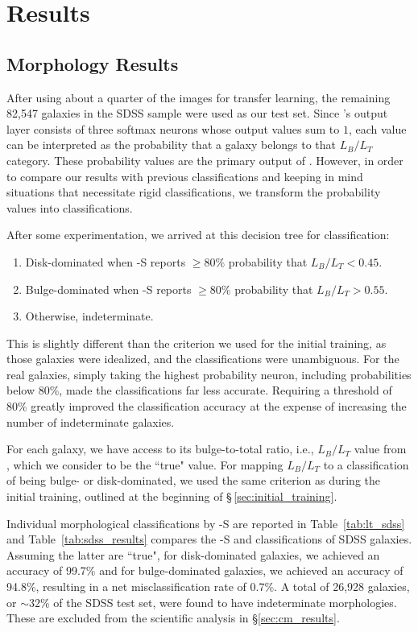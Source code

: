 \section{Results} \label{sec:results}
\subsection{Morphology Results}\label{sec:morph_results}
After using about a quarter of the images for transfer learning, the remaining 82,547 galaxies in the SDSS sample were used as our test set. Since \gamornet{}'s output layer consists of three softmax neurons whose output values sum to $1$, each value can be interpreted as the probability that a galaxy belongs to that $L_B/L_T$ category. These probability values are the primary output of \gamornet{}. However, in order to compare our results with previous classifications and keeping in mind situations that necessitate rigid classifications, we transform the probability values into classifications.

After some experimentation, we arrived at this decision tree for classification:
\begin{enumerate}[noitemsep]
\item Disk-dominated when \gamornet{}-S reports $\geq 80\%$ probability that $L_B/L_T < 0.45$.
\item Bulge-dominated when \gamornet{}-S reports $\geq 80\%$ probability that $L_B/L_T > 0.55$.
\item Otherwise, indeterminate.
\end{enumerate}
This is slightly different than the criterion we used for the initial training, as those galaxies were idealized, and the classifications were unambiguous. For the real galaxies, simply taking the highest probability neuron, including probabilities below 80\%, made the classifications far less accurate. Requiring a threshold of 80\% greatly improved the classification accuracy at the expense of increasing the number of indeterminate galaxies.


For each galaxy, we have access to its bulge-to-total ratio, i.e., $L_B/L_T$ value from \citet{simard_11}, which we consider to be the ``true" value. For mapping $L_B/L_T$ to a classification of being bulge- or disk-dominated, we used the same criterion as during the initial training, outlined at the beginning of \S\,\ref{sec:initial_training}.

Individual morphological classifications by \gamornet{}-S are reported in Table~\ref{tab:lt_sdss} and Table~\ref{tab:sdss_results} compares the \gamornet{}-S and \citet{simard_11} classifications of SDSS galaxies. Assuming the latter are ``true", for disk-dominated galaxies, we achieved an accuracy of 99.7\% and for bulge-dominated galaxies, we achieved an accuracy of 94.8\%, resulting in a net misclassification rate of 0.7\%. A total of 26,928 galaxies, or $\sim 32$\% of the SDSS test set, were found to have indeterminate morphologies. These are excluded from the scientific analysis in \S \ref{sec:cm_results}.

